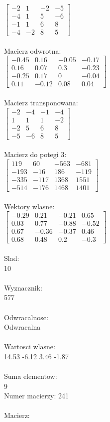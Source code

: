 \documentclass[a4paper,12pt]{article}
\begin{document}
$\begin{bmatrix} -2&1&-2&-5\\-4&1&5&-6\\-1&1&6&8\\-4&-2&8&5 \end{bmatrix}$
\\
\\
Macierz odwrotna:\\

$\begin{bmatrix} -0.45&0.16&-0.05&-0.17\\0.16&0.07&0.3&-0.23\\-0.25&0.17&0&-0.04\\0.11&-0.12&0.08&0.04 \end{bmatrix}$
\\
\\
Macierz transponowana:\\

$\begin{bmatrix} -2&-4&-1&-4\\1&1&1&-2\\-2&5&6&8\\-5&-6&8&5 \end{bmatrix}$
\\
\\
Macierz do potegi 3:\\

$\begin{bmatrix} 119&60&-563&-681\\-193&-16&186&-119\\-335&-117&1368&1551\\-514&-176&1468&1401 \end{bmatrix}$
\\
\\
Wektory wlasne:\\

$\begin{bmatrix} -0.29&0.21&-0.21&0.65\\0.03&0.77&-0.88&-0.52\\0.67&-0.36&-0.37&0.46\\0.68&0.48&0.2&-0.3 \end{bmatrix}$
\\
\\
Slad:\\
10
\\
\\
Wyznacznik:\\
577
\\
\\
Odwracalnosc:\\
Odwracalna
\\
\\
Wartosci wlasne:\\
14.53 -6.12 3.46 -1.87
\\
\\
Suma elementow:\\
9
\\
\newpage
Numer macierzy:
241
\\
\\
Macierz:\\
\end{document}
